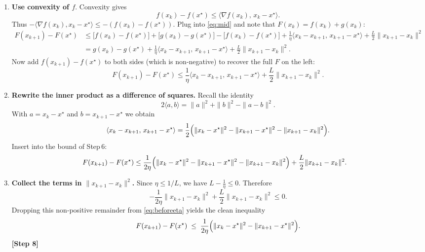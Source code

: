 \documentclass{article}
\begin{document}
\begin{enumerate}
\item[Step 6.] \textbf{Use convexity of $f$}.  
Convexity gives
\[
f(x_{k})-f(x^{\star})\le \langle\nabla f(x_{k}),\,x_{k}-x^{\star}\rangle.
\]
Thus $-\langle\nabla f(x_{k}),x_{k}-x^{\star}\rangle\le -(f(x_{k})-f(x^{\star}))$.
Plug into \eqref{eq:mid} and note that $F(x_{k})=f(x_{k})+g(x_{k})$:
\begin{align}
F(x_{k+1})-F(x^{\star})
&\le \bigl[f(x_{k})-f(x^{\star})\bigr]
   +\bigl[g(x_{k})-g(x^{\star})\bigr]
   -\bigl[f(x_{k})-f(x^{\star})\bigr]   %
   +\frac{1}{\eta}\langle x_{k}-x_{k+1},\,x_{k+1}-x^{\star}\rangle
   +\frac{L}{2}\|x_{k+1}-x_{k}\|^{2}  \nonumber\\
&= g(x_{k})-g(x^{\star})
   +\frac{1}{\eta}\langle x_{k}-x_{k+1},\,x_{k+1}-x^{\star}\rangle
   +\frac{L}{2}\|x_{k+1}-x_{k}\|^{2}.
\label{eq:afterconv}
\end{align}
Now add $f(x_{k+1})-f(x^{\star})$ to both sides (which is non‑negative) to recover the full $F$ on the left:
\[
F(x_{k+1})-F(x^{\star})
\le \frac{1}{\eta}\langle x_{k}-x_{k+1},\,x_{k+1}-x^{\star}\rangle
   +\frac{L}{2}\|x_{k+1}-x_{k}\|^{2}.
\tag{Step 6}
\]

\item[Step 7.] \textbf{Rewrite the inner product as a difference of squares.}  
Recall the identity
\[
2\langle a,b\rangle = \|a\|^{2}+\|b\|^{2}-\|a-b\|^{2}.
\]
With $a=x_{k}-x^{\star}$ and $b=x_{k+1}-x^{\star}$ we obtain
\[
\langle x_{k}-x_{k+1},\,x_{k+1}-x^{\star}\rangle
= \frac{1}{2}\Bigl(\|x_{k}-x^{\star}\|^{2}
                 -\|x_{k+1}-x^{\star}\|^{2}
                 -\|x_{k+1}-x_{k}\|^{2}\Bigr).
\]
Insert into the bound of Step 6:
\begin{align}
F(x_{k+1})-F(x^{\star})
&\le \frac{1}{2\eta}\Bigl(\|x_{k}-x^{\star}\|^{2}
                 -\|x_{k+1}-x^{\star}\|^{2}
                 -\|x_{k+1}-x_{k}\|^{2}\Bigr)
   +\frac{L}{2}\|x_{k+1}-x_{k}\|^{2}.
\label{eq:beforeeta}
\end{align}

\item[Step 8.] \textbf{Collect the terms in $\|x_{k+1}-x_{k}\|^{2}$.}  
Since $\eta\le 1/L$, we have $L-\frac{1}{\eta}\le 0$. Therefore
\[
-\frac{1}{2\eta}\|x_{k+1}-x_{k}\|^{2}
   +\frac{L}{2}\|x_{k+1}-x_{k}\|^{2}
   \le 0.
\]
Dropping this non‑positive remainder from \eqref{eq:beforeeta} yields the clean inequality
\begin{equation}
F(x_{k+1})-F(x^{\star})
\;\le\;
\frac{1}{2\eta}\Bigl(\|x_{k}-x^{\star}\|^{2}
                 -\|x_{k+1}-x^{\star}\|^{2}\Bigr).
\label{eq:fundamental}
\end{equation}
\textbf{[Step 8]}


\end{enumerate}
\end{document}
